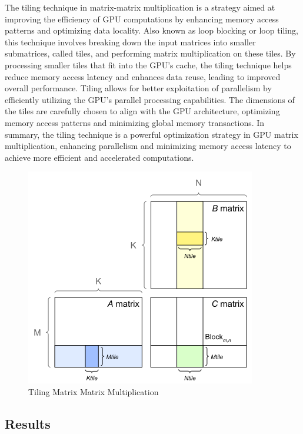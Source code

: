 \documentclass[12p,english]{article}
\begin{document}
The tiling technique in matrix-matrix multiplication is a strategy aimed at improving the efficiency of GPU computations by enhancing memory access patterns and optimizing data locality. Also known as loop blocking or loop tiling, this technique involves breaking down the input matrices into smaller submatrices, called tiles, and performing matrix multiplication on these tiles. By processing smaller tiles that fit into the GPU's cache, the tiling technique helps reduce memory access latency and enhances data reuse, leading to improved overall performance. Tiling allows for better exploitation of parallelism by efficiently utilizing the GPU's parallel processing capabilities. The dimensions of the tiles are carefully chosen to align with the GPU architecture, optimizing memory access patterns and minimizing global memory transactions. In summary, the tiling technique is a powerful optimization strategy in GPU matrix multiplication, enhancing parallelism and minimizing memory access latency to achieve more efficient and accelerated computations.

\begin{figure}[h]
\centering
\includegraphics[scale= 0.55]{tiled-outer-prod.png}
\caption{Tiling Matrix Matrix Multiplication}
\end{figure}

\newpage

\subsection{Results}
\end{document}
